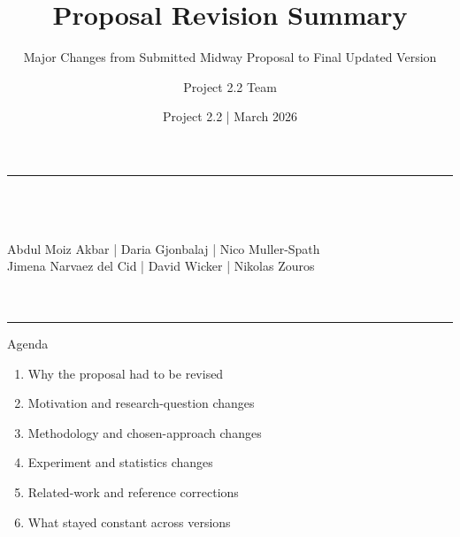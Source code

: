 \documentclass[aspectratio=169,11pt]{beamer}
\title{Proposal Revision Summary}
\subtitle{Major Changes from Submitted Midway Proposal to Final Updated Version}
\author[Project 2.2 Team]{Project 2.2 Team}
\institute{Department of Advanced Computing Sciences\\Maastricht University}
\date{Project 2.2 \;|\; March 2026}
\newcommand{\teamauthors}{Abdul Moiz Akbar \;|\; Daria Gjonbalaj \;|\; Nico Muller-Spath\\Jimena Narvaez del Cid \;|\; David Wicker \;|\; Nikolas Zouros}
\begin{document}
\begin{frame}[plain]
\vfill
\begin{center}
{\color{umorange}\rule{0.42\textwidth}{2pt}}\\[12pt]
{\LARGE\bfseries\color{umdark}\inserttitle}\\[10pt]
{\normalsize\color{umgray}\insertsubtitle}\\[16pt]
{\small\color{umdark}\teamauthors}\\[8pt]
{\small\color{umorange}\insertinstitute}\\[8pt]
{\footnotesize\color{umgray}\insertdate}\\[12pt]
{\color{umorange}\rule{0.42\textwidth}{2pt}}
\end{center}
\vfill
\end{frame}

\begin{frame}{Agenda}
\begin{enumerate}
\item Why the proposal had to be revised
\item Motivation and research-question changes
\item Methodology and chosen-approach changes
\item Experiment and statistics changes
\item Related-work and reference corrections
\item What stayed constant across versions
\end{enumerate}
\end{frame}
\end{document}
